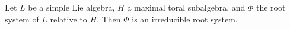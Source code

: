 Let $L$ be a simple Lie algebra, $H$ a maximal toral subalgebra, and $\Phi$ the root system of $L$ relative to $H$. Then $\Phi$ is an irreducible root system.
